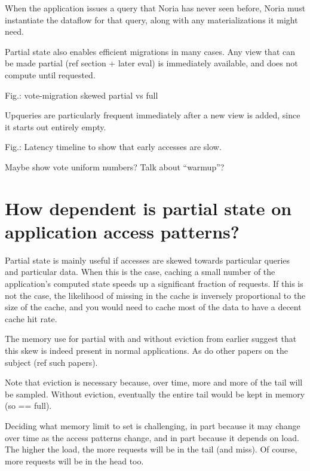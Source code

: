 When the application issues a query that Noria has never seen before, Noria must
instantiate the dataflow for that query, along with any materializations it
might need.

Partial state also enables efficient migrations in many cases. Any view
that can be made partial (ref section + later eval) is immediately
available, and does not compute until requested.

Fig.: vote-migration skewed partial vs full

Upqueries are particularly frequent immediately after a new view is added, since
it starts out entirely empty.

Fig.: Latency timeline to show that early accesses are slow.

\begin{inprogress}
Maybe show vote uniform numbers? Talk about ``warmup''?
\end{inprogress}

\section{How dependent is partial state on application access patterns?}
\label{s:eval:patterns}

Partial state is mainly useful if accesses are skewed towards particular queries
and particular data. When this is the case, caching a small number of the
application's computed state speeds up a significant fraction of requests. If
this is not the case, the likelihood of missing in the cache is inversely
proportional to the size of the cache, and you would need to cache most of the
data to have a decent cache hit rate.

\begin{inprogress}
The memory use for partial with and without eviction from earlier suggest that
this skew is indeed present in normal applications. As do other papers on the
subject (ref such papers).
\end{inprogress}

\begin{inprogress}
Note that eviction is necessary because, over time, more and more of the
tail will be sampled. Without eviction, eventually the entire tail would
be kept in memory (so == full).
\end{inprogress}

Deciding what memory limit to set is challenging, in part because it
may change over time as the access patterns change, and in part because
it depends on load. The higher the load, the more requests will be in
the tail (and miss). Of course, more requests will be in the head too.


